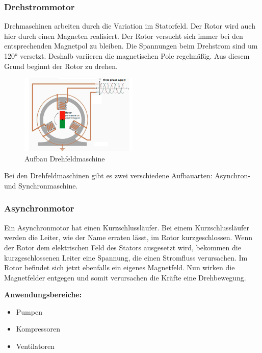 \documentclass[12pt]{scrreprt} %
\begin{document}
\subsubsection{Drehstrommotor}
\label{sec:drehstrom}

Drehmaschinen arbeiten durch die Variation im Statorfeld. Der Rotor wird auch hier durch einen Magneten realisiert. Der Rotor versucht sich immer bei den entsprechenden Magnetpol zu bleiben. Die Spannungen beim Drehstrom sind um 120° versetzt. Deshalb variieren die magnetischen Pole regelmäßig. Aus diesem Grund beginnt der Rotor zu drehen.

\begin{figure}[!ht]
\begin{center}
	\caption{Aufbau Drehfeldmaschine}
	\includegraphics[width=0.5\textwidth]{Drehstrommotor}
\end{center}
\end{figure}

Bei den Drehfeldmaschinen gibt es zwei verschiedene Aufbauarten: Asynchron- und Synchronmaschine.

\subsubsection{Asynchronmotor}
\label{sec:asynchronmotor}

Ein Asynchronmotor hat einen Kurzschlussläufer.
Bei einem Kurzschlussläufer werden die Leiter, wie der Name erraten lässt, im Rotor kurzgeschlossen. Wenn der Rotor dem elektrischen Feld des Stators ausgesetzt wird, bekommen die kurzgeschlossenen Leiter eine Spannung, die einen Stromfluss verursachen. Im Rotor befindet sich jetzt ebenfalls ein eigenes Magnetfeld. Nun wirken die Magnetfelder entgegen und somit verursachen die Kräfte eine Drehbewegung. 

\textbf{Anwendungsbereiche:}

\begin{itemize}
	\item{Pumpen}
	\item{Kompressoren}
	\item{Ventilatoren}
\end{itemize}
\end{document}
